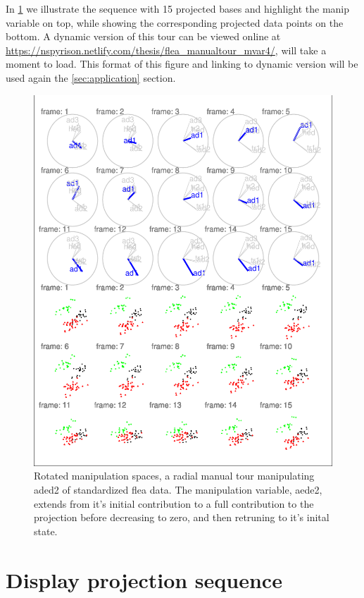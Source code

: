 \documentclass{monashthesis}
\begin{document}
In \ref{fig:step3} we illustrate the sequence with 15 projected bases
and highlight the manip variable on top, while showing the corresponding
projected data points on the bottom. A dynamic version of this tour can
be viewed online at
\url{https://nspyrison.netlify.com/thesis/flea_manualtour_mvar4/}, will
take a moment to load. This format of this figure and linking to dynamic
version will be used again the \ref{sec:application} section.

\begin{figure}
\centering
\includegraphics{thesis_files/figure-latex/step3-1.pdf}
\caption{\label{fig:step3}Rotated manipulation spaces, a radial manual tour
manipulating aded2 of standardized flea data. The manipulation variable,
aede2, extends from it's initial contribution to a full contribution to
the projection before decreasing to zero, and then retruning to it's
inital state.}
\end{figure}

\section{Display projection sequence}\label{display-projection-sequence}
\end{document}
